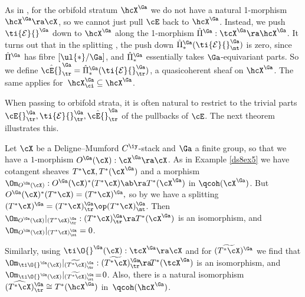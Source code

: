 \documentclass{article}
\begin{document}
As in , for the orbifold stratum $\hcX^\Ga$ we do not
have a natural 1-morphism $\hcX^\Ga\ra\cX$, so we cannot just pull
$\cE$ back to $\hcX^\Ga$. Instead, we push $\ti{\cal E}{}^\Ga$ down
to $\hcX^\Ga$ along the 1-morphism
$\hat\Pi{}^\Ga:\tcX^\Ga\ra\hcX^\Ga$. It turns out that in the
splitting , the push down $\hat\Pi{}^\Ga_* (\ti{\cal
E}{}^\Ga_\nt)$ is zero, since $\hat\Pi{}^\Ga$ has fibre
$[\ul{*}/\Ga]$, and $\hat\Pi{}^\Ga_*$ essentially takes
$\Ga$-equivariant parts. So we define
$\hat\cE{}^\Ga_\tr=\hat\Pi{}^\Ga_* (\ti{\cal E}{}^\Ga_\tr)$, a
quasicoherent sheaf on $\hcX^\Ga$. The same applies
for~$\hcX^\Ga_\ci\subseteq\hcX^\Ga$.

When passing to orbifold strata, it is often natural to restrict to
the trivial parts $\cE{}^\Ga_\tr,\ti{\cal
E}{}^\Ga_\tr,\hat\cE{}^\Ga_\tr$ of the pullbacks of $\cE$. The next
theorem illustrates this.

\begin{thm} Let\/ $\cX$ be a Deligne--Mumford\/ $C^\iy$-stack
and\/ $\Ga$ a finite group, so that we have a\/ $1$-morphism
$O^\Ga(\cX):\cX^\Ga\ra\cX$. As in Example\/ {\rm\ref{ds8ex5}} we
have cotangent sheaves $T^*\cX,T^*(\cX^\Ga)$ and a morphism
$\Om_{\smash{O^\Ga(\cX)}}:O^\Ga(\cX)^*(T^*\cX)\ab \ra T^*(\cX^\Ga)$
in $\qcoh(\cX^\Ga)$. But\/ $O^\Ga(\cX)^*(T^*\cX)=(T^*\cX)^\Ga,$ so
by  we have a splitting
$(T^*\cX)^\Ga=(T^*\cX)^\Ga_\tr\op(T^*\cX)^\Ga_\nt$. Then
$\Om_{\smash{O^\Ga(\cX)}}\vert_{\smash{(T^*\cX)^\Ga_\tr}}:
(T^*\cX)^\Ga_\tr\ra T^*(\cX^\Ga)$ is an isomorphism,
and\/~$\Om_{\smash{O^\Ga(\cX)}}\vert_{\smash{(T^*\cX)^\Ga_\nt}}=0$.

Similarly, using $\ti\O{}^\Ga(\cX): \tcX^\Ga\ra\cX$ and\/
 for ${}\,\,\,\,\,\widetilde{\!\!\!\!\!
(T^*\cX)\!\!\!\!\!} \,\,\,\,\,^\Ga$ we find that\/
$\Om_{\smash{\ti\O{}^\Ga(\cX)}} \vert_{\smash{\,\,\,\,\,
\widetilde{\!\!\!\!\!(T^*\cX)\!\!\!\!\!} \,\,\,\,\, ^\Ga_\tr}}:
\,\,\,\,\,\widetilde{\!\!\!\!\!(T^*\cX)
\!\!\!\!\!}\,\,\,\,\,^\Ga_\tr\!\ra\! T^*(\tcX^\Ga)$ is an
isomorphism, and\/ $\Om_{\smash{\ti\O{}^\Ga(\cX)}}
\vert_{\smash{\,\,\,\,\, \widetilde{\!\!\!\!\!(T^*\cX)\!\!\!\!\!}
\,\,\,\,\,^\Ga_\nt}}\!=\!0$. Also, there is a natural isomorphism
${}\,\,\,\,\,\widehat{ \!\!\!\!\!(T^*\cX)
\!\!\!\!\!}\,\,\,\,\,^\Ga_\tr\cong T^*(\hcX^\Ga)$
in\/~$\qcoh(\hcX^\Ga)$.
\label{ds8thm5}
\end{thm}
\end{document}

